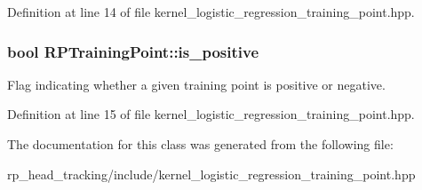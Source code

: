 \-Definition at line 14 of file kernel\-\_\-logistic\-\_\-regression\-\_\-training\-\_\-point.\-hpp.

\hypertarget{struct_r_p_training_point_a1d5421e9f66fc7ffb85e580b2b019eb8}{
\subsubsection[{is\-\_\-positive}]{\setlength{\rightskip}{0pt plus 5cm}bool {\bf \-R\-P\-Training\-Point\-::is\-\_\-positive}}}\label{struct_r_p_training_point_a1d5421e9f66fc7ffb85e580b2b019eb8}
\-Flag indicating whether a given training point is positive or negative. 

\-Definition at line 15 of file kernel\-\_\-logistic\-\_\-regression\-\_\-training\-\_\-point.\-hpp.



\-The documentation for this class was generated from the following file\-:\begin{DoxyCompactItemize}
\item 
rp\-\_\-head\-\_\-tracking/include/kernel\-\_\-logistic\-\_\-regression\-\_\-training\-\_\-point.\-hpp\end{DoxyCompactItemize}
